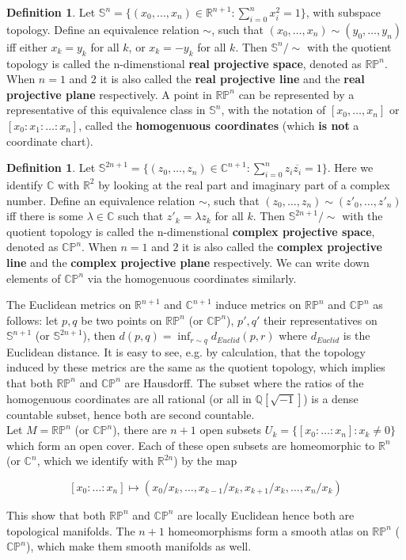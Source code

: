 \documentclass{article}
\theoremstyle{definition}
\newtheorem{dfn}[thm]{Definition}
\begin{document}
\begin{dfn}
    Let $\mathbb{S}^n=\{(x_0, \dots, x_n)\in\mathbb{R}^{n+1}: \sum_{i=0}^n x_i^2=1\}$, with subspace topology. Define an equivalence relation $\sim$, such that $(x_0, \dots, x_n)\sim (y_0, \dots, y_n)$ iff either $x_k=y_k$ for all $k$, or $x_k=-y_k$ for all $k$. Then $\mathbb{S}^n/\sim$ with the quotient topology is called the n-dimenstional {\bf real projective space}, denoted as $\mathbb{RP}^n$. When $n=1$ and $2$ it is also called the {\bf real projective line} and the {\bf real projective plane} respectively. A point in $\mathbb{RP}^n$ can be represented by a representative of this equivalence class in $\mathbb{S}^n$, with the notation of $[x_0, \dots, x_n]$ or $[x_0:x_1:\dots:x_n]$, called the {\bf homogenuous coordinates} (which {\bf is not} a coordinate chart). 
\end{dfn}

\begin{dfn}
    Let $\mathbb{S}^{2n+1}=\{(z_0, \dots, z_n)\in\mathbb{C}^{n+1}: \sum_{i=0}^n z_i\overline{z_i}=1\}$. Here we identify $\mathbb{C}$ with $\mathbb{R}^2$ by looking at the real part and imaginary part of a complex number. Define an equivalence relation $\sim$, such that $(z_0, \dots, z_n)\sim (z'_0, \dots, z'_n)$ iff there is some $\lambda\in\mathbb{C}$ such that $z'_k=\lambda z_k$ for all $k$. Then $\mathbb{S}^{2n+1}/\sim$ with the quotient topology is called the n-dimenstional {\bf complex projective space}, denoted as $\mathbb{CP}^n$. When $n=1$ and $2$ it is also called the {\bf complex projective line} and the {\bf complex projective plane} respectively. We can write down elements of $\mathbb{CP}^n$ via the homogenuous coordinates similarly. 
\end{dfn}
    
The Euclidean metrics on $\mathbb{R}^{n+1}$ and $\mathbb{C}^{n+1}$ induce metrics on $\mathbb{RP}^n$ and $\mathbb{CP}^n$ as follows: let $p, q$ be two points on $\mathbb{RP}^n$ (or $\mathbb{CP}^n$), $p', q'$ their representatives on $\mathbb{S}^{n+1}$ (or $\mathbb{S}^{2n+1}$), then $d(p, q)=\inf_{r\sim q}d_{Euclid}(p, r)$ where $d_{Euclid}$ is the Euclidean distance. It is easy to see, e.g. by calculation, that the topology induced by these metrics are the same as the quotient topology, which implies that both $\mathbb{RP}^n$ and $\mathbb{CP}^n$ are Hausdorff. The subset where the ratios of the homogenuous coordinates are all rational (or all in $\mathbb{Q}[\sqrt{-1}]$) is a dense countable subset, hence both are second countable.\\

Let $M=\mathbb{RP}^n$ (or $\mathbb{CP}^n$), there are $n+1$ open subsets $U_k=\{[x_0:\dots:x_n] : x_k\not=0\}$ which form an open cover. Each of these open subsets are homeomorphic to $\mathbb{R}^n$ (or $\mathbb{C}^n$, which we identify with $\mathbb{R}^{2n}$) by the map

\[[x_0:\dots:x_n]\mapsto (x_0/x_k, \dots, x_{k-1}/x_k, x_{k+1}/x_k, \dots, x_n/x_k)\]

This show that both $\mathbb{RP}^n$ and $\mathbb{CP}^n$ are locally Euclidean hence both are topological manifolds. The $n+1$ homeomorphisms form a smooth atlas on $\mathbb{RP}^n$ ($\mathbb{CP}^n$), which make them smooth manifolds as well.
\end{document}
